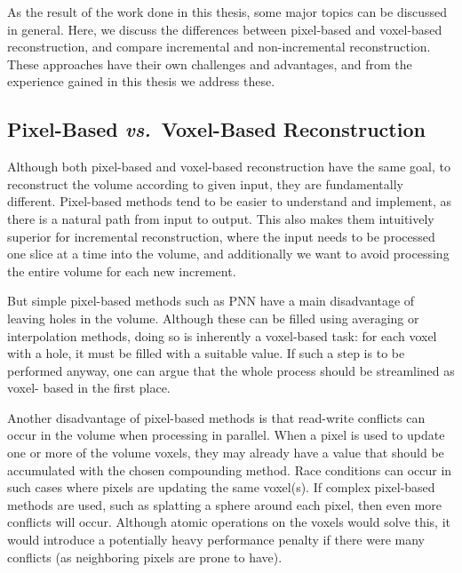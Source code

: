 
As the result of the work done in this thesis, some major topics can be discussed in general. Here, we discuss the differences between pixel-based and voxel-based reconstruction, and compare incremental and non-incremental reconstruction. These approaches have their own challenges and advantages, and from the experience gained in this thesis we address these.

	
\subsection{Pixel-Based \textit{vs.}\ Voxel-Based Reconstruction}

	Although both pixel-based and voxel-based reconstruction have the same goal, to reconstruct the volume according to given input, they are fundamentally different. Pixel-based methods tend to be easier to understand and implement, as there is a natural path from input to output. This also makes them intuitively superior for incremental reconstruction, where the input needs to be processed one slice at a time into the volume, and additionally we want to avoid processing the entire volume for each new increment.
	
	But simple pixel-based methods such as PNN have a main disadvantage of leaving holes in the volume. Although these can be filled using averaging or interpolation methods, doing so is inherently a voxel-based task: for each voxel with a hole, it must be filled with a suitable value. If such a step is to be performed anyway, one can argue that the whole process should be streamlined as voxel- based in the first place.
	
	Another disadvantage of pixel-based methods is that read-write conflicts can occur in the volume when processing in parallel. When a pixel is used to update one or more of the volume voxels, they may already have a value that should be accumulated with the chosen compounding method. Race conditions can occur in such cases where pixels are updating the same voxel(s). If complex pixel-based methods are used, such as splatting a sphere around each pixel, then even more conflicts will occur. Although atomic operations on the voxels would solve this, it would introduce a potentially heavy performance penalty if there were many conflicts (as neighboring pixels are prone to have).
	
